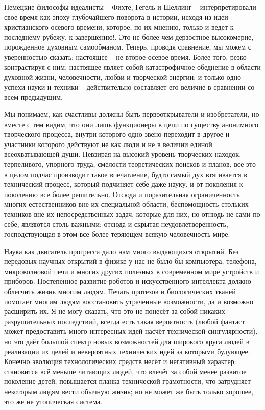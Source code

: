 Немецкие философы-идеалисты -- Фихте, Гегель и Шеллинг -- интерпретировали 
свое время как эпоху глубочайшего поворота в истории, исходя из идеи 
христианского осевого времени, которое, по их мнению, только и ведет к 
последнему рубежу, к завершению!. Это не более чем дерзостное высокомерие, 
порожденное духовным самообманом. Теперь, проводя сравнение, мы можем с 
уверенностью сказать: настоящее -- не второе осевое время. Более того, резко 
контрастируя с ним, настоящее являет собой катастрофичное обеднение в области 
духовной жизни, человечности, любви и творческой энергии; и только одно -- 
успехи науки и техники -- действительно составляет его величие в сравнении со 
всем предыдущим. 

Мы понимаем, как счастливы должны быть первооткрыватели и изобретатели, но 
вместе с тем видим, что они лишь функционеры в цепи по существу анонимного 
творческого процесса, внутри которого одно звено переходит в другое и 
участники которого действуют не как люди и не в величии единой всеохватывающей 
души. Невзирая на высокий уровень творческих находок, терпеливого, упорного 
труда, смелости теоретических поисков и планов, все это в целом подчас 
производит такое впечатление, будто самый дух втягивается в технический 
процесс, который подчиняет себе даже науку, и от поколения к поколению все 
более решительно. Отсюда и поразительная ограниченность многих естественников 
вне их специальной области, беспомощность стольких техников вне их 
непосредственных задач, которые для них, но отнюдь не сами по себе, являются 
столь важными; отсюда и скрытая неудовлетворенность, господствующая в этом 
все более теряющем всякую человечность мире.\cite{bib:03}

Наука как двигатель прогресса дало нам много выдающихся открытий. Без 
передовых научных открытий в физике у нас не было бы компьютера, телефона, 
микроволновой печи и многих других полезных в современном мире устройств и 
приборов. Постепенное развитие роботов и искусственного интеллекта должно 
облегчить жизнь многим людям. Печать протезов и биологических тканей помогает 
многим людям восстановить утраченные возможности, да и возможно расширить их. 
Я не могу сказать, что это не понесёт за собой никаких разрушительных 
последствий, всегда есть такая вероятность (любой фантаст может предоставить 
много интересных идей насчёт технической сингулярности), но это даёт большой 
спектр новых возможностей для широкого круга людей в реализации их целей и 
невероятных технических идей за которыми будующее. Конечно эволюция 
технологических средств несёт и негативный характер: становится всё меньше 
читающих людей, что влечёт за собой менее развитое поколение детей, повышается 
планка технической грамотности, что затрудняет некоторым людям вести обычную 
жизнь; но не может же быть только хорошее, это же не утопическая система.

